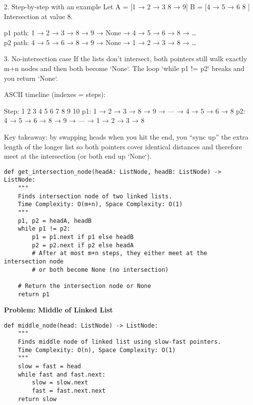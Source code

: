 2. Step-by-step with an example  
   Let A = [1 → 2 → 3   8 → 9]  
       B = [4 → 5 → 6      8 ]  
   Intersection at value 8.  
   
   p1 path:  
   1 → 2 → 3 → 8 → 9 → None → 4 → 5 → 6 → 8 → …  \\
   p2 path:  
   4 → 5 → 6 → 8 → 9 → None → 1 → 2 → 3 → 8 → …  


3. No‐intersection case  
   If the lists don’t intersect, both pointers still walk exactly m+n nodes and then both become `None`. The loop `while p1 != p2` breaks and you return `None`.

ASCII timeline (indexes = steps):

   Step:   1  2  3  4  5  6  7  8  9 10  
   p1:     1 → 2 → 3 → 8 → 9 → — → 4 → 5 → 6 → 8  
   p2:     4 → 5 → 6 → 8 → 9 → — → 1 → 2 → 3 → 8  

Key takeaway: by swapping heads when you hit the end, you “sync up” the extra length of the longer list so both pointers cover identical distances and therefore meet at the intersection (or both end up `None`).
\begin{verbatim}
def get_intersection_node(headA: ListNode, headB: ListNode) -> ListNode:
    """
    Finds intersection node of two linked lists.
    Time Complexity: O(m+n), Space Complexity: O(1)
    """
    p1, p2 = headA, headB
    while p1 != p2:
        p1 = p1.next if p1 else headB
        p2 = p2.next if p2 else headA
        # After at most m+n steps, they either meet at the intersection node
        # or both become None (no intersection)

    # Return the intersection node or None
    return p1
\end{verbatim}

\noindent\textbf{Problem: Middle of Linked List}
\begin{verbatim}
def middle_node(head: ListNode) -> ListNode:
    """
    Finds middle node of linked list using slow-fast pointers.
    Time Complexity: O(n), Space Complexity: O(1)
    """
    slow = fast = head
    while fast and fast.next:
        slow = slow.next
        fast = fast.next.next
    return slow
\end{verbatim}

